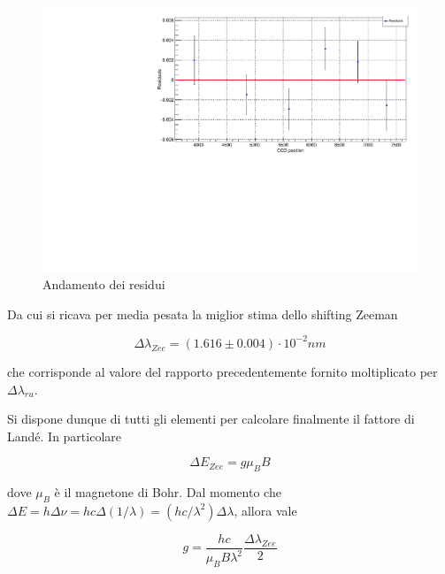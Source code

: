 \documentclass{article}
\begin{document}
	\begin{center}
		\begin{figure}[H]
			\centering
			\includegraphics[scale=0.38, angle=0]{campomax/residuals.pdf}
			\caption{Andamento dei residui}
			\label{fig:fit_dlambdazee_res}
		\end{figure}
	\end{center}

	Da cui si ricava per media pesata la miglior stima dello shifting Zeeman

	\[
		\Delta\lambda_{Zee} = (1.616 \pm 0.004) \cdot 10^{-2} nm	
	\]

	che corrisponde al valore del rapporto precedentemente fornito moltiplicato per $\Delta\lambda_{ru}$.

	Si dispone dunque di tutti gli elementi per calcolare finalmente il fattore di Landé. In particolare

	\begin{equation}
		\Delta E_{Zee} = g \mu_B B
	\end{equation}

	dove $\mu_B$ è il magnetone di Bohr.
	Dal momento che $\Delta E = h\Delta\nu = hc\Delta(1/\lambda) = (hc / \lambda^2) \Delta\lambda$, 
	allora vale 

	\begin{equation}
		g = \frac{hc}{\mu_B B \lambda^2} \frac{\Delta\lambda_{Zee}}{2}
	\end{equation}
\end{document}
